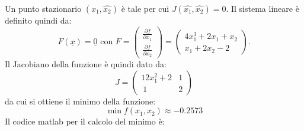 \begin{flushleft}
Un punto stazionario $(\hat{x_1}, \hat{x_2})$ è tale per cui $J(\hat{x_1},\hat{x_2})=0$. 
Il sistema lineare è definito quindi da:
\[
F(\underline{x})=\underline{0}\mbox{ con }F=\begin{pmatrix}\frac{\partial f}{\partial x_1}\\\frac{\partial f}{\partial x_2}\end{pmatrix}=\begin{pmatrix}4x_1^3+2x_1+x_2\\x_1+2x_2-2\end{pmatrix}.
\]
Il Jacobiano della funzione è quindi dato da: 
\[ 
J=\begin{pmatrix} 12x_1^2+2 & 1  \\\ 1 & 2 \end{pmatrix}
\]
da cui si ottiene il minimo della funzione:
\[
\min{f(x_1,x_2)}\approx -0.2573
\]
Il codice matlab per il calcolo del minimo è:

\end{flushleft}